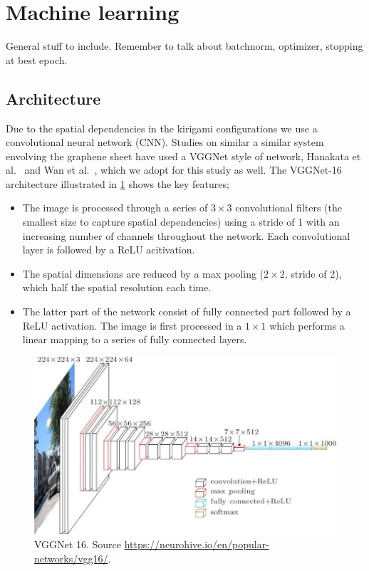 \section{Machine learning}

General stuff to include. Remember to talk about batchnorm, optimizer, stopping at best epoch. 


\subsection{Architecture}
Due to the spatial dependencies in the kirigami configurations we use a convolutional neural network (\acrshort{CNN}). Studies on similar a similar system envolving the graphene sheet have used a VGGNet style of network, Hanakata et al.\ \cite{PhysRevLett.121.255304}\cite{PhysRevResearch.2.042006} and Wan et al.\ \cite{graphene/hBN}, which we adopt for this study as well. The VGGNet-16 architecture illustrated in \cref{fig:VGGNet16} shows the key features; 
\begin{itemize}
  \item The image is processed through a series of $3 \times 3$ convolutional filters (the smallest size to capture spatial dependencies) using a stride of 1 with an increasing number of channels throughout the network. Each convolutional layer is followed by a ReLU acitivation. 
  \item The spatial dimensions are reduced by a max pooling ($2 \times 2$, stride of 2), which half the spatial resolution each time. 
  \item The latter part of the network consist of fully connected part followed by a ReLU activation. The image is first processed in a $1 \times 1$ which performs a linear mapping to a series of fully connected layers. 
\end{itemize}

\begin{figure}[H]
  \centering
  \includegraphics[width=0.7\linewidth]{figures/ML/VGGNet16.jpg}
  \caption{VGGNet 16. Source \url{https://neurohive.io/en/popular-networks/vgg16/}.}
  \label{fig:VGGNet16}
\end{figure}

